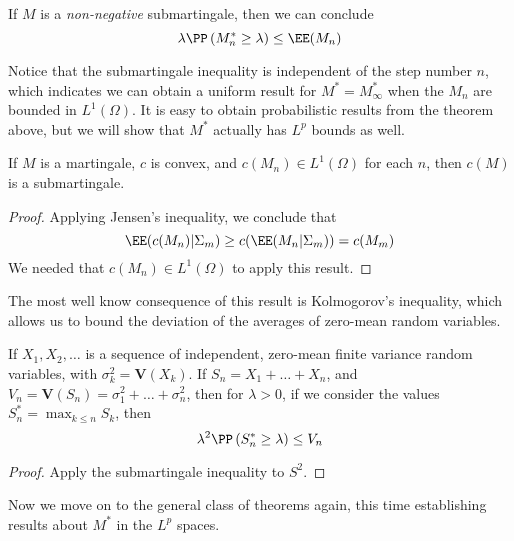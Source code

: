\begin{corollary}
    If $M$ is a {\it non-negative} submartingale, then we can conclude
    \[ \lambda \PP \left( M^*_n \geq \lambda \right) \leq \EE(M_n) \]
\end{corollary}

Notice that the submartingale inequality is independent of the step number $n$, which indicates we can obtain a uniform result for $M^* = M^*_\infty$ when the $M_n$ are bounded in $L^1(\Omega)$. It is easy to obtain probabilistic results from the theorem above, but we will show that $M^*$ actually has $L^p$ bounds as well.

\begin{lemma}
    If $M$ is a martingale, $c$ is convex, and $c(M_n) \in L^1(\Omega)$ for each $n$, then $c(M)$ is a submartingale.
\end{lemma}
\begin{proof}
    Applying Jensen's inequality, we conclude that
    \[ \EE(c(M_n)|\Sigma_m) \geq c(\EE(M_n|\Sigma_m)) = c(M_m) \]
    We needed that $c(M_n) \in L^1(\Omega)$ to apply this result.
\end{proof}

The most well know consequence of this result is Kolmogorov's inequality, which allows us to bound the deviation of the averages of zero-mean random variables.

\begin{corollary}
    If $X_1, X_2, \dots$ is a sequence of independent, zero-mean finite variance random variables, with $\sigma_k^2 = \mathbf{V}(X_k)$. If $S_n = X_1 + \dots + X_n$, and $V_n = \mathbf{V}(S_n) = \sigma_1^2 + \dots + \sigma_n^2$, then for $\lambda > 0$, if we consider the values $S^*_n = \max_{k \leq n} S_k$, then
    \[ \lambda^2 \PP \left( S^*_n \geq \lambda \right) \leq V_n \]
\end{corollary}
\begin{proof}
    Apply the submartingale inequality to $S^2$.
\end{proof}

Now we move on to the general class of theorems again, this time establishing results about $M^*$ in the $L^p$ spaces.

